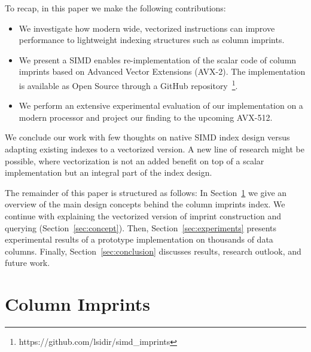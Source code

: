 \documentclass[sigconf]{acmart}
\begin{document}
To recap, in this paper we make the following contributions:
\begin{itemize}
    \item We investigate how modern wide, vectorized instructions can improve performance to lightweight indexing structures such as column imprints.
    \item We present a SIMD enables re-implementation of the scalar code of column imprints based on Advanced Vector Extensions (AVX-2). The implementation is available as Open Source through a GitHub repository~\footnote{https://github.com/lsidir/simd\_imprints}.
    \item We perform an extensive experimental evaluation of our implementation on a modern processor and project our finding to the upcoming AVX-512.
\end{itemize}

We conclude our work with few thoughts on native SIMD index design versus 
adapting existing indexes to a vectorized version. A new line of research might be 
possible, where vectorization is not an added benefit on top of a scalar implementation but an integral part of the index design. 

The remainder of this paper is structured as follows: In Section~\ref{sec:imprints} we give an overview of the main design concepts behind the column imprints index. We continue with explaining the vectorized version of imprint construction and querying (Section~\ref{sec:concept}). Then, Section~\ref{sec:experiments} presents experimental results of a prototype implementation on thousands of data columns. Finally, Section~\ref{sec:conclusion} discusses results, research outlook, and future work.

\section{Column Imprints}\label{sec:imprints}
\end{document}
